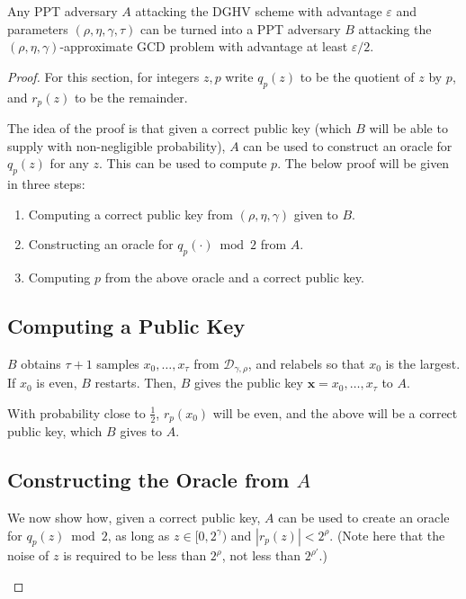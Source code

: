 \begin{theorem}
Any PPT adversary $A$ attacking the DGHV scheme with advantage $\varepsilon$ and parameters $(\rho, \eta, \gamma, \tau)$ can be turned into a PPT adversary $B$ attacking the $(\rho, \eta, \gamma)$-approximate GCD problem with advantage at least $\varepsilon / 2$.
\end{theorem}
\begin{proof}
For this section, for integers $z, p$ write $q_p(z)$ to be the quotient of $z$ by $p$, and $r_p(z)$ to be the remainder.


The idea of the proof is that given a correct public key (which $B$ will be able to supply with non-negligible probability), $A$ can be used to construct an oracle for $q_p(z) $ for any $z$. This can be used to compute $p$. The below proof will be given in three steps:
\begin{enumerate}
\item Computing a correct public key from $(\rho, \eta, \gamma)$ given to $B$.
\item Constructing an oracle for $q_p(\cdot) \bmod 2$ from $A$.
\item Computing $p$ from the above oracle and a correct public key.

\end{enumerate}


\subsection{Computing a Public Key}
$B$ obtains $\tau + 1$ samples $x_0, \dots, x_\tau$ from $\mathcal{D}_{\gamma, \rho}$, and relabels so that $x_0$ is the largest. If $x_0$ is even, $B$ restarts. Then, $B$ gives the public key $\mathbf{x} = x_0, \dots, x_\tau$ to $A$.

With probability close to $\frac{1}{2}$, $r_p(x_0)$ will be even, and the above will be a correct public key, which $B$ gives to $A$.


\subsection{Constructing the Oracle from $A$}
We now show how, given a correct public key, $A$ can be used to create an oracle for $q_p(z) \bmod 2$, as long as $z \in [0, 2^\gamma)$ and $|r_p(z)| < 2^\rho$. (Note here that the noise of $z$ is required to be less than $2^\rho$, not less than $2^{\rho'}$.)

\begin{enumerate}


\end{enumerate}
\end{proof}
